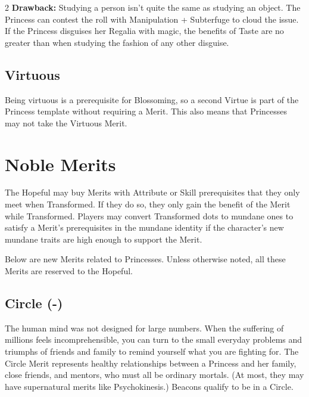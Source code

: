 \begin{multicols}{2}
\textbf{Drawback:} Studying a person isn't quite the same as studying an object. The Princess can contest the roll with Manipulation + Subterfuge to cloud the issue. If the Princess disguises her Regalia with magic, the benefits of Taste are no greater than when studying the fashion of any other disguise.

\subsection*{Virtuous}

Being virtuous is a prerequisite for Blossoming, so a second Virtue is part of the Princess template without requiring a Merit. This also means that Princesses may not take the Virtuous Merit.


\section*{Noble Merits} 
The Hopeful may buy Merits with Attribute or Skill prerequisites that they only meet when Transformed. If they do so, they only gain the benefit of the Merit while Transformed. Players may convert Transformed dots to mundane ones to satisfy a Merit's prerequisites in the mundane identity if the character's new mundane traits are high enough to support the Merit.

Below are new Merits related to Princesses. Unless otherwise noted, all these Merits are reserved to the Hopeful. 

\subsection*{Circle (\textbullet\nobreak\hspace{.16667em}-\nobreak\hspace{.16667em}\textbullet\textbullet\textbullet\textbullet\textbullet)}

The human mind was not designed for large numbers. When the suffering of millions feels incomprehensible, you can turn to the small everyday problems and triumphs of friends and family to remind yourself what you are fighting for. The Circle Merit represents healthy relationships between a Princess and her family, close friends, and mentors, who must all be ordinary mortals. (At most, they may have supernatural merits like Psychokinesis.) Beacons qualify to be in a Circle.


\end{multicols}
